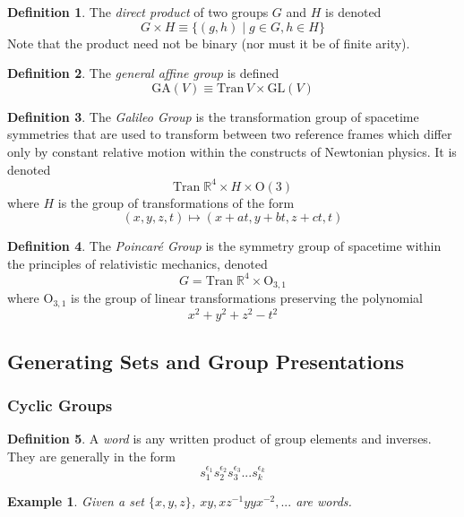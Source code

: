 \documentclass{article}
\newtheorem{example}{Example}[section]
\theoremstyle{remark}
\theoremstyle{definition}
\newtheorem{definition}{Definition}[section]
\begin{document}
\begin{definition}
The \textit{direct product} of two groups $G$ and $H$ is denoted
\[G \times H \equiv \{ (g, h)\;|\; g \in G, h \in H \} \]
Note that the product need not be binary (nor must it be of finite arity). 
\end{definition}

\begin{definition}
The \textit{general affine group} is defined 
\[ \text{GA}(V) \equiv \text{Tran}\,V \times \text{GL}(V)\]
\end{definition}

\begin{definition}
The \textit{Galileo Group} is the transformation group of spacetime symmetries that are used to transform between two reference frames which differ only by constant relative motion within the constructs of Newtonian physics. It is denoted 
\[ \text{Tran}\;\mathbb{R}^{4} \times H \times \text{O} (3)\]
where $H$ is the group of transformations of the form 
\[ (x, y, z, t) \longmapsto (x+at, y+bt, z+ct, t)\]
\end{definition}

\begin{definition}
The \textit{Poincaré Group} is the symmetry group of spacetime within the principles of relativistic mechanics, denoted
\[ G = \text{Tran}\; \mathbb{R}^{4} \times \text{O}_{3,1}\]
where O$_{3,1}$ is the group of linear transformations preserving the polynomial 
\[ x^{2} + y^{2} + z^{2} - t^{2}\]
\end{definition}

\subsection{Generating Sets and Group Presentations}
\subsubsection{Cyclic Groups}
\begin{definition}
A \textit{word} is any written product of group elements and inverses. They are generally in the form
\[s_{1}^{\epsilon_{1}} s_{2}^{\epsilon_{2}} s_{3}^{\epsilon_{3}}... s_{k}^{\epsilon_{k}}\]
\end{definition}

\begin{example}
Given a set $\{x,y,z\}$, $x y, x z^{-1} y y x^{-2},...$ are words. 
\end{example}
\end{document}
